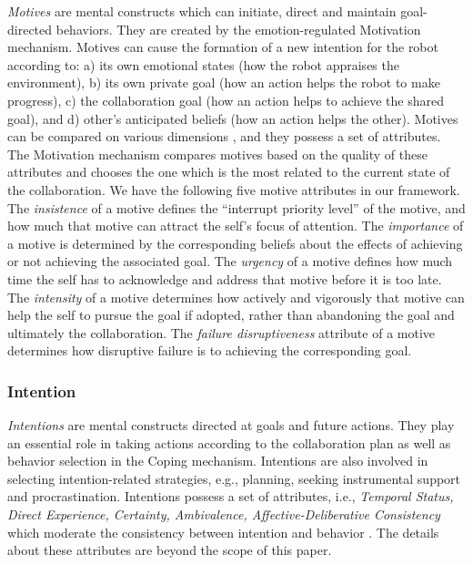 \documentclass{article}
\begin{document}
\textit{Motives} are mental constructs which can initiate, direct and maintain
goal-directed behaviors. They are created by the emotion-regulated Motivation
mechanism. Motives can cause the formation of a new intention for the robot
according to: a) its own emotional states (how the robot appraises the
environment), b) its own private goal (how an action helps the robot to make
progress), c) the collaboration goal (how an action helps to achieve the shared
goal), and d) other's anticipated beliefs (how an action helps the other).
Motives can be compared on various dimensions \cite{sloman:motivation}, and
they possess a set of attributes. The Motivation mechanism compares motives
based on the quality of these attributes and chooses the one which is the most
related to the current state of the collaboration. We have the following five
motive attributes in our framework. The \textit{insistence} of a motive defines
the ``interrupt priority level'' of the motive, and how much that motive can
attract the self's focus of attention. The \textit{importance} of a motive is
determined by the corresponding beliefs about the effects of achieving or not
achieving the associated goal. The \textit{urgency} of a motive defines how much
time the self has to acknowledge and address that motive before it is too late.
The \textit{intensity} of a motive determines how actively and vigorously that
motive can help the self to pursue the goal if adopted, rather than abandoning
the goal and ultimately the collaboration. The \textit{failure disruptiveness}
attribute of a motive determines how disruptive failure is to achieving the
corresponding goal.

\subsubsection{Intention}

\textit{Intentions} are mental constructs directed at goals and future actions.
They play an essential role in taking actions according to the collaboration
plan as well as behavior selection in the Coping mechanism. Intentions are
also involved in selecting intention-related strategies, e.g., planning, seeking
instrumental support and procrastination. Intentions possess a set of
attributes, i.e., \textit{Temporal Status, Direct Experience, Certainty,
Ambivalence, Affective-Deliberative Consistency} which moderate the consistency
between intention and behavior \cite{cooke:intention-behavior-consistency}. The
details about these attributes are beyond the scope of this paper.
\end{document}
